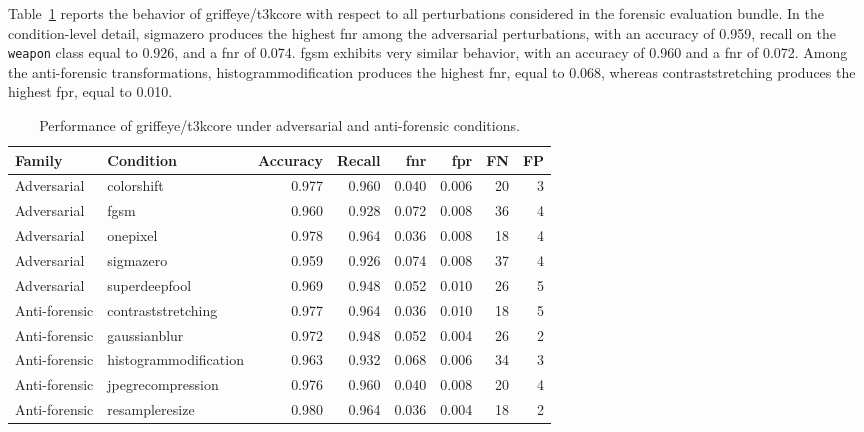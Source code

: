 Table~\ref{tab:results-griffeye-attack-metrics} reports the behavior of
\gls{griffeye}/\gls{t3kcore} with respect to all perturbations considered in the
forensic evaluation bundle. In the condition-level detail, \gls{sigmazero}
produces the highest \gls{fnr} among the adversarial perturbations, with an
accuracy of 0.959, recall on the \texttt{weapon} class equal to 0.926, and a
\gls{fnr} of 0.074. \gls{fgsm} exhibits very similar behavior, with an accuracy
of 0.960 and a \gls{fnr} of 0.072. Among the anti-forensic transformations,
\gls{histogrammodification} produces the highest \gls{fnr}, equal to 0.068,
whereas \gls{contraststretching} produces the highest \gls{fpr}, equal to
0.010.

\begin{table}[H]
\centering
\scriptsize
\renewcommand{\arraystretch}{1.12}
\setlength{\tabcolsep}{4pt}
\caption{Performance of \gls{griffeye}/\gls{t3kcore} under adversarial and anti-forensic conditions.}
\label{tab:results-griffeye-attack-metrics}
\begin{tabular}{@{}llrrrrrr@{}}
\toprule
\textbf{Family} &
\textbf{Condition} &
\textbf{Accuracy} &
\textbf{Recall} &
\textbf{\gls{fnr}} &
\textbf{\gls{fpr}} &
\textbf{FN} &
\textbf{FP} \\
\midrule

Adversarial &
\gls{colorshift} &
0.977 & 0.960 & 0.040 & 0.006 & 20 & 3 \\

Adversarial &
\gls{fgsm} &
0.960 & 0.928 & 0.072 & 0.008 & 36 & 4 \\

Adversarial &
\gls{onepixel} &
0.978 & 0.964 & 0.036 & 0.008 & 18 & 4 \\

Adversarial &
\gls{sigmazero} &
0.959 & 0.926 & 0.074 & 0.008 & 37 & 4 \\

Adversarial &
\gls{superdeepfool} &
0.969 & 0.948 & 0.052 & 0.010 & 26 & 5 \\

\midrule

Anti-forensic &
\gls{contraststretching} &
0.977 & 0.964 & 0.036 & 0.010 & 18 & 5 \\

Anti-forensic &
\gls{gaussianblur} &
0.972 & 0.948 & 0.052 & 0.004 & 26 & 2 \\

Anti-forensic &
\gls{histogrammodification} &
0.963 & 0.932 & 0.068 & 0.006 & 34 & 3 \\

Anti-forensic &
\gls{jpegrecompression} &
0.976 & 0.960 & 0.040 & 0.008 & 20 & 4 \\

Anti-forensic &
\gls{resampleresize} &
0.980 & 0.964 & 0.036 & 0.004 & 18 & 2 \\

\bottomrule
\end{tabular}
\end{table}

